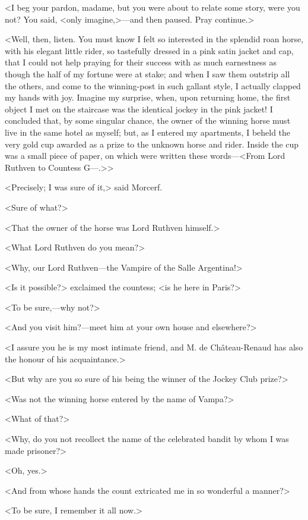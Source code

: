 <I beg your pardon, madame, but you were about to relate some story, were you not? You said, <only imagine,>—and then paused. Pray continue.> 

 <Well, then, listen. You must know I felt so interested in the splendid roan horse, with his elegant little rider, so tastefully dressed in a pink satin jacket and cap, that I could not help praying for their success with as much earnestness as though the half of my fortune were at stake; and when I saw them outstrip all the others, and come to the winning-post in such gallant style, I actually clapped my hands with joy. Imagine my surprise, when, upon returning home, the first object I met on the staircase was the identical jockey in the pink jacket! I concluded that, by some singular chance, the owner of the winning horse must live in the same hotel as myself; but, as I entered my apartments, I beheld the very gold cup awarded as a prize to the unknown horse and rider. Inside the cup was a small piece of paper, on which were written these words—<From Lord Ruthven to Countess G—.>> 

 <Precisely; I was sure of it,> said Morcerf. 

 <Sure of what?> 

 <That the owner of the horse was Lord Ruthven himself.> 

 <What Lord Ruthven do you mean?> 

 <Why, our Lord Ruthven—the Vampire of the Salle Argentina!> 

 <Is it possible?> exclaimed the countess; <is he here in Paris?> 

 <To be sure,—why not?> 

 <And you visit him?—meet him at your own house and elsewhere?> 

 <I assure you he is my most intimate friend, and M. de Château-Renaud has also the honour of his acquaintance.> 

 <But why are you so sure of his being the winner of the Jockey Club prize?> 

 <Was not the winning horse entered by the name of Vampa?> 

 <What of that?> 

 <Why, do you not recollect the name of the celebrated bandit by whom I was made prisoner?> 

 <Oh, yes.> 

 <And from whose hands the count extricated me in so wonderful a manner?> 

 <To be sure, I remember it all now.> 


